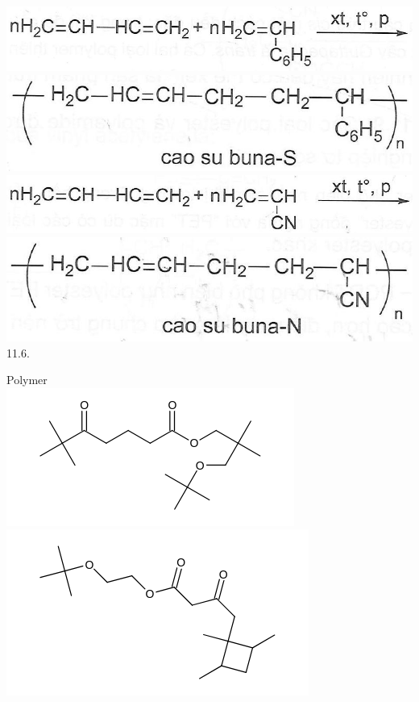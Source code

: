 \documentclass[10pt]{article}
\begin{document}
\includegraphics[max width=\textwidth, center]{2025_10_23_b4e16b74380d0f7e7700g-068(5)}\\
\includegraphics[max width=\textwidth, center]{2025_10_23_b4e16b74380d0f7e7700g-068}\\
\includegraphics[max width=\textwidth, center]{2025_10_23_b4e16b74380d0f7e7700g-068(4)}\\
\includegraphics[max width=\textwidth, center]{2025_10_23_b4e16b74380d0f7e7700g-068(1)}\\
11.6.

Polymer\\
\includegraphics{smile-f9c60624748cfa7dd69b1f5ea0f56ffe663b9138}\\
\includegraphics{smile-7f01fbba9fc4880c34ffa1f21199f05db2b58a9c}
\end{document}
